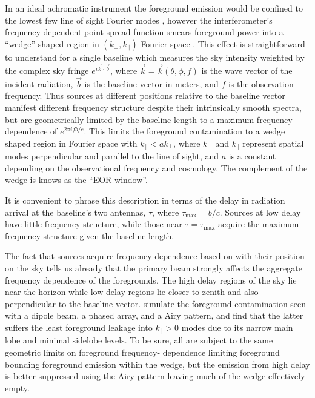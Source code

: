 \documentclass{emulateapj}
\begin{document}

In an ideal achromatic instrument the foreground emission would be confined to the lowest few 
line of sight Fourier modes \citep[e.g.,][]{MoralesBowmanHewittFGsub}, however  the  
interferometer's frequency-dependent point spread function smears foreground power into a ``wedge'' shaped 
region in  $(k_\perp,k_\parallel)$ Fourier space \citep{Dattapowerspec,X13, PoberWedge,MoralesPSShapes, VedanthamWedge, nithya13, CathWedge, AdrianWedge1, AdrianWedge2}. This effect is straightforward to understand for a single baseline which measures the sky intensity weighted by the complex sky fringe 
$e^{i \vec{k}\cdot\vec{b}}$, where $\vec{k}=\vec{k}(\theta,\phi,f)$ is the wave vector of 
the incident radiation, $\vec{b}$ is the baseline vector in meters, and $f$ is the observation frequency. Thus sources at different positions relative to the baseline vector manifest different 
frequency structure despite their intrinsically smooth spectra, but are geometrically limited 
by the baseline length to a maximum frequency dependence of  $e^{2\pi i f b/c}$. This limits the foreground contamination 
to a wedge shaped region in Fourier space with $k_\parallel<a k_\perp$, where $k_\perp$ and $k_\parallel$ represent spatial modes 
perpendicular and parallel to the line of sight, and $a$ is a constant depending on the observational frequency and cosmology. The complement of the wedge is knows as the ``EOR window''.

It is convenient to phrase this description in terms 
of the delay in radiation arrival at the baseline's two antennas, $\tau$, where $\tau_
\text{max}=b/c$. Sources at low delay have little frequency 
structure, while those near $\tau=\tau_\text{max}$ acquire the maximum frequency 
structure given the baseline length. 

The fact that sources acquire frequency dependence based on with their position on the sky 
tells us already that the primary beam strongly affects the aggregate frequency dependence 
of the foregrounds. The high delay regions of the sky lie near the horizon while low delay 
regions lie closer to zenith and also perpendicular to the baseline vector. \citet{nithya15} 
simulate the foreground contamination seen with a dipole beam, a phased array, and a Airy pattern,
and find that the latter suffers the least foreground leakage into
 $k_\parallel>0$ modes due to its narrow main lobe and minimal sidelobe 
levels. To be sure, all are subject to the same geometric limits on foreground frequency-
dependence limiting foreground bounding foreground emission within the wedge, but the emission from high delay is better suppressed using the 
Airy pattern leaving much of the wedge effectively empty. 
\end{document}
